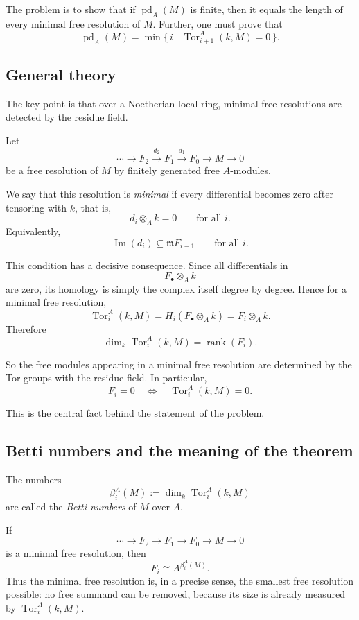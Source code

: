 \documentclass[12pt,a4paper]{article}
\theoremstyle{notespace}
\DeclareMathOperator{\Tor}{Tor}
\begin{document}
The problem is to show that if \(\operatorname{pd}_A(M)\) is finite, then it equals the length of every minimal free resolution of \(M\). Further, one must prove that
\[
\operatorname{pd}_A(M)
=
\min \bigl\{\, i \;\big|\; \Tor^A_{i+1}(k,M)=0 \,\bigr\}.
\]

\subsection{General theory}

The key point is that over a Noetherian local ring, minimal free resolutions are detected by the residue field.

Let
\[
\cdots \longrightarrow F_2 \xrightarrow{d_2} F_1 \xrightarrow{d_1} F_0 \longrightarrow M \longrightarrow 0
\]
be a free resolution of \(M\) by finitely generated free \(A\)-modules.

We say that this resolution is \emph{minimal} if every differential becomes zero after tensoring with \(k\), that is,
\[
d_i \otimes_A k = 0
\qquad \text{for all } i.
\]
Equivalently,
\[
\operatorname{Im}(d_i)\subseteq \mathfrak m F_{i-1}
\qquad \text{for all } i.
\]

This condition has a decisive consequence. Since all differentials in
\[
F_\bullet \otimes_A k
\]
are zero, its homology is simply the complex itself degree by degree. Hence for a minimal free resolution,
\[
\Tor_i^A(k,M)
=
H_i(F_\bullet \otimes_A k)
=
F_i \otimes_A k.
\]
Therefore
\[
\dim_k \Tor_i^A(k,M)=\operatorname{rank}(F_i).
\]

So the free modules appearing in a minimal free resolution are determined by the Tor groups with the residue field. In particular,
\[
F_i=0
\quad \Longleftrightarrow \quad
\Tor_i^A(k,M)=0.
\]

This is the central fact behind the statement of the problem.

\subsection{Betti numbers and the meaning of the theorem}

The numbers
\[
\beta_i^A(M):=\dim_k \Tor_i^A(k,M)
\]
are called the \emph{Betti numbers} of \(M\) over \(A\).

If
\[
\cdots \longrightarrow F_2 \longrightarrow F_1 \longrightarrow F_0 \longrightarrow M \longrightarrow 0
\]
is a minimal free resolution, then
\[
F_i \cong A^{\beta_i^A(M)}.
\]
Thus the minimal free resolution is, in a precise sense, the smallest free resolution possible: no free summand can be removed, because its size is already measured by \(\Tor_i^A(k,M)\).
\end{document}
